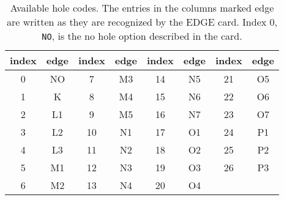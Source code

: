 \documentclass[11pt,oneside]{report} %
\begin{document}
\begin{table}[htbp]
  \begin{center}
    \begin{tabular}[h]{|c>{\ttfamily}c|c>{\ttfamily}c|c>{\ttfamily}c|c>{\ttfamily}c|}
      \hline
      index & \textrm{edge} & index & \textrm{edge} & index &
      \textrm{edge} & index & \textrm{edge} \\
      \hline
      0  & NO & 7  & M3 & 14 & N5 & 21 & O5 \\
      1  & K  & 8  & M4 & 15 & N6 & 22 & O6 \\
      2  & L1 & 9  & M5 & 16 & N7 & 23 & O7 \\
      3  & L2 & 10 & N1 & 17 & O1 & 24 & P1 \\
      4  & L3 & 11 & N2 & 18 & O2 & 25 & P2 \\
      5  & M1 & 12 & N3 & 19 & O3 & 26 & P3 \\
      6  & M2 & 13 & N4 & 20 & O4 &    &    \\
      \hline
    \end{tabular}
    \caption[Available hole codes]{Available hole codes.  The entries
      in the columns marked edge are written as they are recognized by
      the EDGE card.  Index 0, \texttt{NO}, is the no hole option
      described in the  card.}
    \label{tab:holecodes}
  \end{center}
\end{table}
\end{document}
